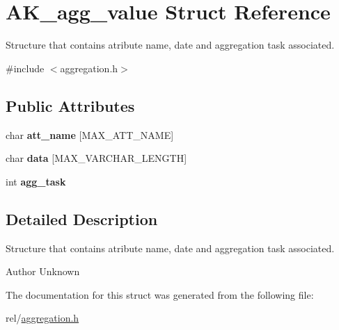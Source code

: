 \hypertarget{structAK__agg__value}{\section{A\+K\+\_\+agg\+\_\+value Struct Reference}
\label{structAK__agg__value}
}


Structure that contains atribute name, date and aggregation task associated.  




{\ttfamily \#include $<$aggregation.\+h$>$}

\subsection*{Public Attributes}
\begin{DoxyCompactItemize}
\item 
\hypertarget{structAK__agg__value_a9df4167edf419cbd33e005a390385fb8}{char {\bfseries att\+\_\+name} \mbox{[}M\+A\+X\+\_\+\+A\+T\+T\+\_\+\+N\+A\+M\+E\mbox{]}}\label{structAK__agg__value_a9df4167edf419cbd33e005a390385fb8}

\item 
\hypertarget{structAK__agg__value_a9f87cbb26037fbabffea44d099fec5ff}{char {\bfseries data} \mbox{[}M\+A\+X\+\_\+\+V\+A\+R\+C\+H\+A\+R\+\_\+\+L\+E\+N\+G\+T\+H\mbox{]}}\label{structAK__agg__value_a9f87cbb26037fbabffea44d099fec5ff}

\item 
\hypertarget{structAK__agg__value_a3cdd683e1321dc4a9d3c5dd4900bfaa3}{int {\bfseries agg\+\_\+task}}\label{structAK__agg__value_a3cdd683e1321dc4a9d3c5dd4900bfaa3}

\end{DoxyCompactItemize}


\subsection{Detailed Description}
Structure that contains atribute name, date and aggregation task associated. 

\begin{DoxyAuthor}{Author}
Unknown 
\end{DoxyAuthor}


The documentation for this struct was generated from the following file\+:\begin{DoxyCompactItemize}
\item 
rel/\hyperlink{aggregation_8h}{aggregation.\+h}\end{DoxyCompactItemize}
